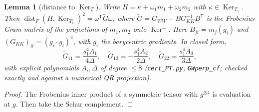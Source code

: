 \documentclass[11pt]{article}
\newtheorem{lemma}[theorem]{Lemma}
\theoremstyle{remark}
\begin{document}
\begin{lemma}[distance to $\operatorname{Ker}_T$]\label{lem:dist}
Write $H=\kappa+\omega_1m_1+\omega_2m_2$ with $\kappa\in\operatorname{Ker}_{T_1}$. Then $\operatorname{dist}_F(H,\operatorname{Ker}_{T_1})^2=\omega^{\mathsf T}\tilde G\omega$, where
$\tilde G=G_{WW}-BG_{KK}^{-1}B^{\mathsf T}$ is the Frobenius Gram matrix of the projections of $m_1,m_2$ onto $\operatorname{Ker}^\perp$.
Here $B_{ji}=m_j(g_i)$ and $(G_{KK})_{il}=(g_i\cdot g_l)^4$, with $g_i$ the barycentric gradients. In closed form,
\[
\tilde G_{11}=\frac{s_1^4A_1}{4\Delta},\quad\tilde G_{12}=-\frac{s_1^4A_2}{2\Delta},\quad\tilde G_{22}=\frac{s_1^4A_3}{3\Delta},
\]
with explicit polynomials $A_i,\Delta$ of degree $\le8$ (\texttt{cert\_PT.py}, \texttt{GWperp\_cf}; checked exactly and against a numerical QR
projection).
\end{lemma}
\begin{proof}
The Frobenius inner product of a symmetric tensor with $g^{\otimes4}$ is evaluation at $g$. Then take the Schur complement.
\end{proof}
\end{document}

